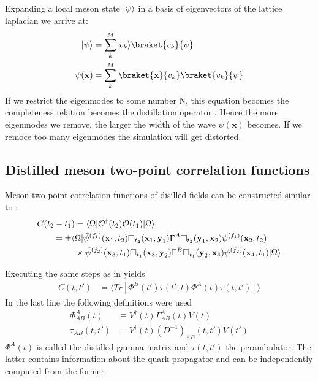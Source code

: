     Expanding a local meson state $\lvert\psi\rangle$ in a basis of eigenvectors of the lattice laplacian we arrive at:
    \begin{equation}
        \begin{aligned}
            \ket{\psi} &= \sum_k^M \ket{v_k}\braket{v_k}{\psi}\\
            \psi(\textbf{x}) &= \sum_k^M \braket{\textbf{x}}{v_k}\braket{v_k}{\psi}
        \end{aligned}
    \end{equation}
    If we restrict the eigenmodes to some number N, this equation becomes the completeness relation becomes the distillation operator . Hence the more eigenmodes we remove, the larger the width of the wave $\psi(\textbf{x})$ becomes. If we remoce too many eigenmodes the simulation will get distorted.
    
\subsection{Distilled meson two-point correlation functions}
    Meson two-point correlation functions of disilled fields can be constructed similar to :
    \begin{equation}
        \begin{aligned}
            C(t_2 - t_1) &= \langle\Omega| \mathcal{O}^\dagger(t_2) \mathcal{O}(t_1)|\Omega\rangle\\
            = \pm\langle&\Omega| \bar{\psi}^{(f_1)}(\textbf{x}_1,t_2)\Box_{t_2}(\textbf{x}_1,\textbf{y}_1)\Gamma^A
            \Box_{t_2}(\textbf{y}_1,\textbf{x}_2)\psi^{(f_1)}(\textbf{x}_2,t_2)\\
            &\times \bar{\psi}^{(f_2)}(\textbf{x}_3,t_1)\Box_{t_1}(\textbf{x}_3,\textbf{y}_2)\Gamma^B
            \Box_{t_1}(\textbf{y}_2,\textbf{x}_4)\psi^{(f_2)}(\textbf{x}_4,t_1) |\Omega\rangle
        \end{aligned}
    \end{equation}

    Executing the same steps as in  yields
    \begin{equation}
        \begin{aligned}
            C(t,t') &= \langle Tr[\Phi^B(t')\tau(t',t)\Phi^A(t)\tau(t,t')] \rangle
        \end{aligned}
    \end{equation}
    In the last line the following definitions were used
    \begin{equation}
        \begin{aligned}\label{def_gamma_and_perambulator}
            \Phi_{AB}^A(t) &\equiv V^\dagger(t)\Gamma_{AB}^A(t)V(t)\\
            \tau_{AB}(t,t') &\equiv V^\dagger(t)(D^{-1})_{AB}(t,t')V(t')
        \end{aligned}
    \end{equation}
    $\Phi^A(t)$ is called the distilled gamma matrix and $\tau(t,t')$ the perambulator. The latter contains information about the quark propagator and can be independently computed from the former.
    
